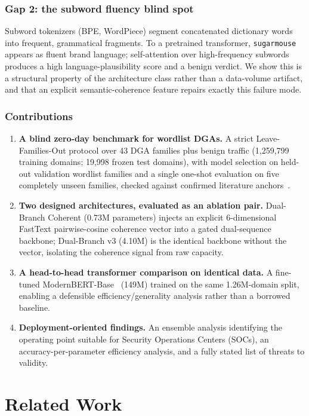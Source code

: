 \documentclass[conference]{IEEEtran}
\begin{document}
\subsubsection*{Gap 2: the subword fluency blind spot}
Subword tokenizers (BPE, WordPiece) segment concatenated dictionary words into frequent, grammatical fragments. To a pretrained transformer, \texttt{sugarmouse} appears as fluent brand language; self-attention over high-frequency subwords produces a high language-plausibility score and a benign verdict. We show this is a structural property of the architecture class rather than a data-volume artifact, and that an explicit semantic-coherence feature repairs exactly this failure mode.

\subsubsection*{Contributions}
\begin{enumerate}
\item \textbf{A blind zero-day benchmark for wordlist DGAs.} A strict Leave-Families-Out protocol over 43 DGA families plus benign traffic (1,259,799 training domains; 19,998 frozen test domains), with model selection on held-out validation wordlist families and a single one-shot evaluation on five completely unseen families, checked against confirmed literature anchors~\cite{drichel2022,leyva2026}.
\item \textbf{Two designed architectures, evaluated as an ablation pair.} Dual-Branch Coherent (0.73M parameters) injects an explicit 6-dimensional FastText pairwise-cosine coherence vector into a gated dual-sequence backbone; Dual-Branch v3 (4.10M) is the identical backbone without the vector, isolating the coherence signal from raw capacity.
\item \textbf{A head-to-head transformer comparison on identical data.} A fine-tuned ModernBERT-Base~\cite{modernbert2024} (149M) trained on the same 1.26M-domain split, enabling a defensible efficiency/generality analysis rather than a borrowed baseline.
\item \textbf{Deployment-oriented findings.} An ensemble analysis identifying the operating point suitable for Security Operations Centers (SOCs), an accuracy-per-parameter efficiency analysis, and a fully stated list of threats to validity.
\end{enumerate}

\section{Related Work}
\end{document}
